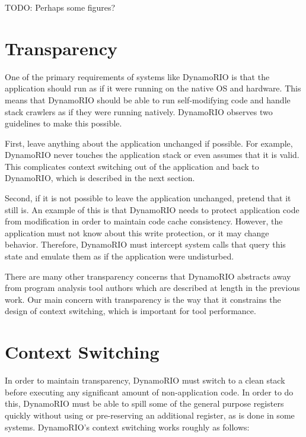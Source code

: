 TODO: Perhaps some figures?

\section{Transparency}

One of the primary requirements of systems like DynamoRIO is that the
application should run as if it were running on the native OS and hardware.
This means that DynamoRIO should be able to run self-modifying code and handle
stack crawlers as if they were running natively.  DynamoRIO observes two
guidelines to make this possible.

First, leave anything about the application unchanged if possible.  For
example, DynamoRIO never touches the application stack or even assumes that it
is valid.  This complicates context switching out of the application and back
to DynamoRIO, which is described in the next section.

Second, if it is not possible to leave the application unchanged, pretend that
it still is.  An example of this is that DynamoRIO needs to protect application
code from modification in order to maintain code cache consistency.  However,
the application must not know about this write protection, or it may change
behavior.  Therefore, DynamoRIO must intercept system calls that query this
state and emulate them as if the application were undisturbed.

There are many other transparency concerns that DynamoRIO abstracts away from
program analysis tool authors which are described at length in the previous
work.  Our main concern with transparency is the way that it constrains the
design of context switching, which is important for tool performance.

\section{Context Switching}

%


In order to maintain transparency, DynamoRIO must switch to a clean stack
before executing any significant amount of non-application code.  In order to
do this, DynamoRIO must be able to spill some of the general purpose registers
quickly without using or pre-reserving an additional register, as is done in
some systems.\cite{TODO}  DynamoRIO's context switching works roughly as
follows:

